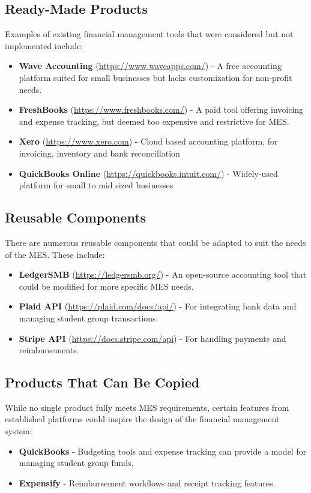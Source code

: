 \documentclass[12pt]{article}
\begin{document}
\subsection{Ready-Made Products}

Examples of existing financial management tools that were considered but not implemented include:
\begin{itemize}
    \item \textbf{Wave Accounting} (\href{https://www.waveapps.com/}{https://www.waveapps.com/}) - A free accounting platform suited for small businesses but lacks customization for non-profit needs.
    \item \textbf{FreshBooks} (\href{https://www.freshbooks.com/}{https://www.freshbooks.com/}) - A paid tool offering invoicing and expense tracking, but deemed too expensive and restrictive for MES.
    \item \textbf{Xero} (\href{https://www.xero.com}{https://www.xero.com}) - Cloud based accounting platform, for invoicing, inventory and bank reconcillation
    \item \textbf{QuickBooks Online} (\href{https://quickbooks.intuit.com/}{https://quickbooks.intuit.com/}) - Widely-used platform for small to mid sized businesses

\end{itemize}
\subsection{Reusable Components}
There are numerous reusable components that could be adapted to suit the needs of the MES. These include:
\begin{itemize}
    \item \textbf{LedgerSMB} (\href{https://ledgersmb.org/}{https://ledgersmb.org/}) - An open-source accounting tool that could be modified for more specific MES needs.
    \item \textbf{Plaid API} (\href{https://plaid.com/docs/api/}{https://plaid.com/docs/api/}) - For integrating bank data and managing student group transactions.
    \item \textbf{Stripe API} (\href{https://docs.stripe.com/api}{https://docs.stripe.com/api}) - For handling payments and reimbursements.
\end{itemize}

\subsection{Products That Can Be Copied}
While no single product fully meets MES requirements, certain features from established platforms could inspire the design of the financial management system:
\begin{itemize}
    \item \textbf{QuickBooks} - Budgeting tools and expense tracking can provide a model for managing student group funds.
    \item \textbf{Expensify} - Reimbursement workflows and receipt tracking features.
\end{itemize}
\end{document}
